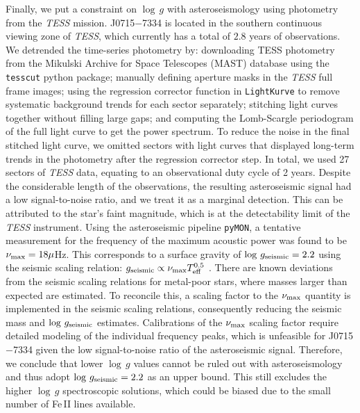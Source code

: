 \documentclass{natureprintstyle}
\newcommand{\logg}{\ensuremath{\log\,g}\xspace}
\newcommand{\umpstar}{J0715$-$7334\xspace}
\begin{document}
Finally, we put a constraint on \logg with asteroseismology using photometry from the \textit{TESS} mission\cite{Ricker2015_TESS}.
\umpstar is located in the southern continuous viewing zone of \textit{TESS}, which currently has a total of $2.8$ years of observations.
We detrended the time-series photometry by\cite{Stello2022}: 
downloading TESS photometry from the Mikulski Archive for Space Telescopes (MAST) database using the \texttt{tesscut} python package\cite{Brasseur2019};
manually defining aperture masks in the \textit{TESS} full frame images;
using the regression corrector function in \texttt{LightKurve}\cite{LightKurve} to remove systematic background trends for each sector separately;
stitching light curves together without filling large gaps; and 
computing the Lomb-Scargle periodogram\cite{Lomb1976,Scargle1982} of the full light curve to get the power spectrum. 
To reduce the noise in the final stitched light curve, we omitted sectors with light curves that displayed long-term trends in the photometry after the regression corrector step. In total, we used 27 sectors of \textit{TESS} data, equating to an observational duty cycle of 2 years. Despite the considerable length of the observations, the resulting asteroseismic signal had a low signal-to-noise ratio, and we treat it as a marginal detection. This can be attributed to the star’s faint magnitude, which is at the detectability limit of the \textit{TESS} instrument.
Using the asteroseismic pipeline \texttt{pyMON}\cite{Howell2025}, a tentative measurement for the frequency of the maximum acoustic power was found to be $\nu_{\rm max} = 18\mu$Hz. 
This corresponds to a surface gravity of $\logg_{\rm seismic} = 2.2$ using the seismic scaling relation\cite{KjeldsenBedding1995}: $\ensuremath{g}_{\rm seismic}\propto\nu_{\rm max} \ensuremath{T_{\mathrm{eff}}}^{0.5}$ . 
There are known deviations from the seismic scaling relations for metal-poor stars, where masses larger than expected are estimated\cite{Epstein14_metal_poor_seismo, Schonhut-Stasik2024}. 
To reconcile this, a scaling factor to the $\nu_{\rm max}$ quantity is implemented in the seismic scaling relations, consequently reducing the seismic mass and $\logg_{\rm seismic}$ estimates\cite{Huber2024,Larsen2025}. Calibrations of the $\nu_{\rm max}$ scaling factor require detailed modeling of the individual frequency peaks, which is unfeasible for \umpstar given the low signal-to-noise ratio of the asteroseismic signal. Therefore, we conclude that lower $\logg$ values cannot be ruled out with asteroseismology and thus adopt $\logg_{\rm seismic} = 2.2$ as an upper bound.
This still excludes the higher $\logg$ spectroscopic solutions, which could be biased due to the small number of Fe\,II lines available.
\end{document}
